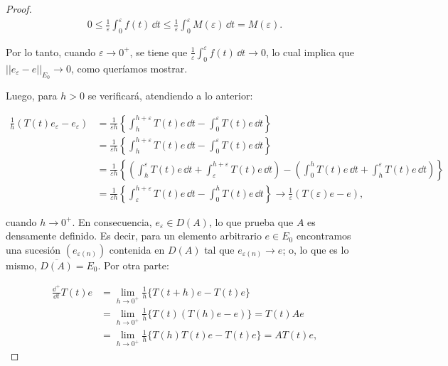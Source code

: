 \begin{proof}
    \begin{align*}
        0 \leq \frac{1}{\varepsilon} \int_0^{\varepsilon} f(t) \, \dd t \leq \frac{1}{\varepsilon} \int_0^{\varepsilon} M(\varepsilon) \, \dd t = M(\varepsilon).
    \end{align*}

    Por lo tanto, cuando $\varepsilon \rightarrow 0^+$, se tiene que $\frac{1}{\varepsilon}\int_0^{\varepsilon} f(t) \, \dd t \rightarrow 0$, lo cual implica que $||e_{\varepsilon} - e||_{E_0} \rightarrow 0$, como queríamos mostrar.

    Luego, para $h > 0$ se verificará, atendiendo a lo anterior:

    \begin{align*}
        \frac{1}{h}(T(t)e_{\varepsilon} - e_{\varepsilon}) &= \frac{1}{\varepsilon h} \left \{\int_{h}^{h + \varepsilon} T(t)e \, \dd t - \int_0^{\varepsilon} T(t)e \, \dd t \right \}\\
        &= \frac{1}{\varepsilon h} \left \{\int_{h}^{h + \varepsilon} T(t)e \, \dd t - \int_0^{\varepsilon} T(t)e \, \dd t \right \}\\
        &= \frac{1}{\varepsilon h} \left \{ \left ( \int_{h}^{\varepsilon} T(t)e \, \dd t + \int_{\varepsilon}^{h + \varepsilon} T(t)e \, \dd t\right ) - \left ( \int_0^{h} T(t)e \, \dd t + \int_h^{\varepsilon} T(t)e \, \dd t \right ) \right \}\\
        &= \frac{1}{\varepsilon h} \left \{\int_{\varepsilon}^{h + \varepsilon} T(t)e \, \dd t - \int_0^{h} T(t)e \, \dd t \right \} \rightarrow \frac{1}{\varepsilon}(T(\varepsilon)e - e),
    \end{align*}

    cuando $h \rightarrow 0^+$. En consecuencia, $e_{\varepsilon} \in D(A)$, lo que prueba que $A$ es densamente definido. Es decir, para un elemento arbitrario $e \in E_0$ encontramos una sucesión $(e_{\varepsilon(n)})$ contenida en $D(A)$ tal que $e_{\varepsilon(n)} \rightarrow e$; o, lo que es lo mismo, $\overline{D(A)} = E_0$. Por otra parte:

    \begin{align*}
        \frac{\dd^+}{\dd t}T(t)e &= \lim_{h \rightarrow 0^+} \frac{1}{h} \Big \{T(t + h)e - T(t)e \Big \}\\
        &= \lim_{h \rightarrow 0^+} \frac{1}{h} \Big \{T(t) (T(h)e - e)  \Big \} = T(t)Ae\\
        &= \lim_{h \rightarrow 0^+} \frac{1}{h} \Big \{T(h)T(t)e - T(t)e  \Big \} = AT(t)e,
    \end{align*}


\end{proof}
